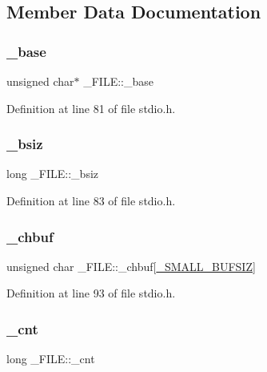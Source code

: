 \subsection{Member Data Documentation}
\mbox{\label{struct__FILE_a2152494c67eaf2520f2cbc54270f1a3c}} 
\subsubsection{\texorpdfstring{\_base}{\_base}}
{\footnotesize\ttfamily unsigned char$\ast$ \+\_\+\+F\+I\+L\+E\+::\+\_\+base}



Definition at line 81 of file stdio.\+h.

\mbox{\label{struct__FILE_a8047f6ae39aaa27b30d06ba49dd31951}} 
\subsubsection{\texorpdfstring{\_bsiz}{\_bsiz}}
{\footnotesize\ttfamily long \+\_\+\+F\+I\+L\+E\+::\+\_\+bsiz}



Definition at line 83 of file stdio.\+h.

\mbox{\label{struct__FILE_ac2c8e185d05c6a5cf9835376d206d0af}} 
\subsubsection{\texorpdfstring{\_chbuf}{\_chbuf}}
{\footnotesize\ttfamily unsigned char \+\_\+\+F\+I\+L\+E\+::\+\_\+chbuf\mbox{[}\mbox{\hyperlink{stdio_8h_a9a061eceee5e1799e31f1c8419f57f2c}{\+\_\+\+S\+M\+A\+L\+L\+\_\+\+B\+U\+F\+S\+IZ}}\mbox{]}}



Definition at line 93 of file stdio.\+h.

\mbox{\label{struct__FILE_aaaf4216b278e7aaea0486fbdd6c7a64a}} 
\subsubsection{\texorpdfstring{\_cnt}{\_cnt}}
{\footnotesize\ttfamily long \+\_\+\+F\+I\+L\+E\+::\+\_\+cnt}



